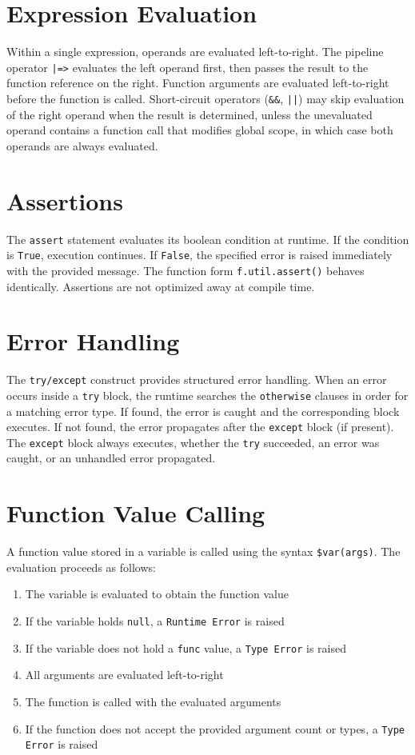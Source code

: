 \section{Expression Evaluation}
Within a single expression, operands are evaluated left-to-right. The pipeline operator \texttt{|=>} evaluates the left operand first, then passes the result to the function reference on the right. Function arguments are evaluated left-to-right before the function is called. Short-circuit operators (\texttt{\&\&}, \texttt{||}) may skip evaluation of the right operand when the result is determined, unless the unevaluated operand contains a function call that modifies global scope, in which case both operands are always evaluated.

\section{Assertions}
The \texttt{assert} statement evaluates its boolean condition at runtime. If the condition is \texttt{True}, execution continues. If \texttt{False}, the specified error is raised immediately with the provided message. The function form \texttt{f.util.assert()} behaves identically. Assertions are not optimized away at compile time.

\section{Error Handling}
The \texttt{try/except} construct provides structured error handling. When an error occurs inside a \texttt{try} block, the runtime searches the \texttt{otherwise} clauses in order for a matching error type. If found, the error is caught and the corresponding block executes. If not found, the error propagates after the \texttt{except} block (if present). The \texttt{except} block always executes, whether the \texttt{try} succeeded, an error was caught, or an unhandled error propagated.

\section{Function Value Calling}
A function value stored in a variable is called using the syntax \texttt{\$var(args)}. The evaluation proceeds as follows:
\begin{enumerate}
\item The variable is evaluated to obtain the function value
\item If the variable holds \texttt{null}, a \texttt{Runtime Error} is raised
\item If the variable does not hold a \texttt{func} value, a \texttt{Type Error} is raised
\item All arguments are evaluated left-to-right
\item The function is called with the evaluated arguments
\item If the function does not accept the provided argument count or types, a \texttt{Type Error} is raised
\end{enumerate}

